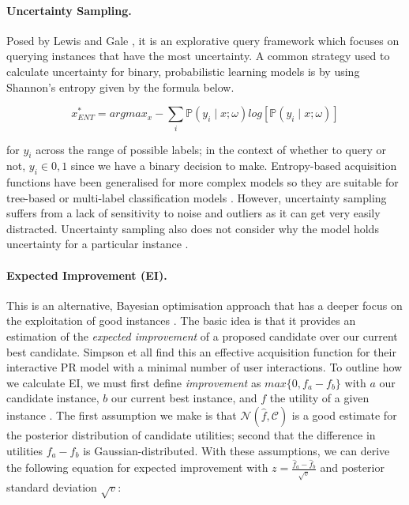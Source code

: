 \documentclass[ %
                    author={James Stephenson},
                supervisor={Dr. Edwin Simpson},
                    degree={MSc},
                     title={PROJECT PLAN},
                  subtitle={ Bayesian Deep Learning For Extractive Test Summarisation},
                      type={},
                      year={2022}]{../additions/dissertation}
\begin{document}
				\paragraph{Uncertainty Sampling.} Posed by Lewis and Gale \cite{Lewis94}, it is an explorative query framework which focuses on querying instances that have the most uncertainty. A common strategy used to calculate uncertainty for binary, probabilistic learning models is by using Shannon’s entropy \cite{Shannon48} given by the formula below.

				$$
					x^{\ast}_{ENT} = argmax_{x} - \sum_i \mathbb{P}(y_i \mid x; \omega) log \left[ \mathbb{P}(y_i \mid x; \omega) \right]
				$$
	
				\noindent
				for $y_i$ across the range of possible labels; in the context of whether to query or not, $y_i \in {0,1}$ since we have a binary decision to make. Entropy-based acquisition functions have been generalised for more complex models so they are suitable for tree-based or multi-label classification models \cite{Craven08, Hwa04}. However, uncertainty sampling suffers from a lack of sensitivity to noise and outliers as it can get very easily distracted. Uncertainty sampling also does not consider why the model holds uncertainty for a particular instance \cite{Sharma17}.

				\paragraph{Expected Improvement (EI).} This is an alternative, Bayesian optimisation approach that has a deeper focus on the exploitation of good instances \cite{Mockus75}. The basic idea is that it provides an estimation of the \emph{expected improvement} of a proposed candidate over our current best candidate. Simpson et all \cite{Simpson19} find this an effective acquisition function for their interactive PR model with a minimal number of user interactions. To outline how we calculate EI, we must first define \emph{improvement} as $max\{0, f_a - f_b\}$ with $a$ our candidate instance, $b$ our current best instance, and $f$ the utility of a given instance \cite{Simpson19}. The first assumption we make is that $\mathcal{N}(\hat{f}, \mathcal{C})$ is a good estimate for the posterior distribution of candidate utilities; second that the difference in utilities $f_a - f_b$ is Gaussian-distributed. With these assumptions, we can derive the following equation for expected improvement with $z = \frac{\hat{f}_a - \hat{f}_b}{\sqrt{v}}$ and posterior standard deviation $\sqrt{v}$:
\end{document}
